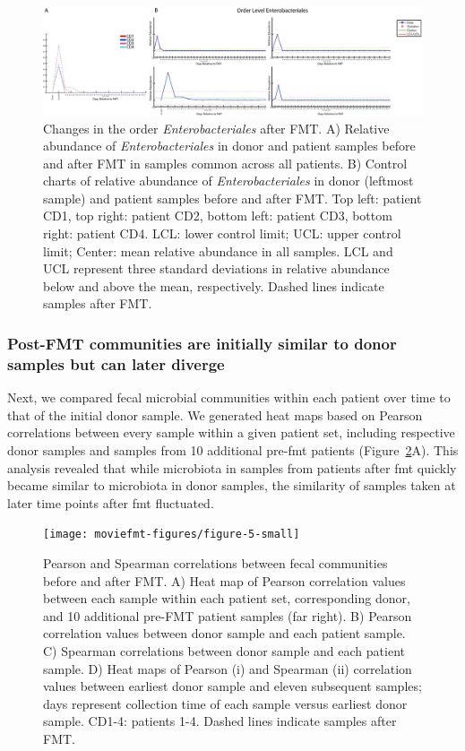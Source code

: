 \begin{figure}
\includegraphics[width=\textheight]{moviefmt-figures/figure-4-small}
\caption[Changes in the order \textit{Enterobacteriales} after FMT.]{Changes in the order \textit{Enterobacteriales} after FMT. A) Relative abundance of \textit{Enterobacteriales} in donor and patient samples before and after FMT in samples common across all patients. B) Control charts of relative abundance of \textit{Enterobacteriales} in donor (leftmost sample) and patient samples before and after FMT. Top left: patient CD1, top right: patient CD2, bottom left: patient CD3, bottom right: patient CD4. LCL: lower control limit; UCL: upper control limit; Center: mean relative abundance in all samples. LCL and UCL represent three standard deviations in relative abundance below and above the mean, respectively. Dashed lines indicate samples after FMT.}
\label{moviefmt-fig4}
\end{figure}

\subsubsection{Post-FMT communities are initially similar to donor samples but can later diverge}

Next, we compared fecal microbial communities within each patient over time to that of the initial donor sample. We generated heat maps based on Pearson correlations between every sample within a given patient set, including respective donor samples and samples from 10 additional pre-\gls{fmt} patients (Figure~\ref{moviefmt-fig5}A). This analysis revealed that while microbiota in samples from patients after \gls{fmt} quickly became similar to microbiota in donor samples, the similarity of samples taken at later time points after \gls{fmt} fluctuated.

\begin{figure}
\texttt{[image: moviefmt-figures/figure-5-small]}
\caption[Pearson and Spearman correlations between fecal communities before and after FMT.]{Pearson and Spearman correlations between fecal communities before and after FMT. A) Heat map of Pearson correlation values between each sample within each patient set, corresponding donor, and 10 additional pre-FMT patient samples (far right). B) Pearson correlation values between donor sample and each patient sample. C) Spearman correlations between donor sample and each patient sample. D) Heat maps of Pearson (i) and Spearman (ii) correlation values between earliest donor sample and eleven subsequent samples; days represent collection time of each sample versus earliest donor sample. CD1-4: patients 1-4. Dashed lines indicate samples after FMT.}
\label{moviefmt-fig5}
\end{figure}


